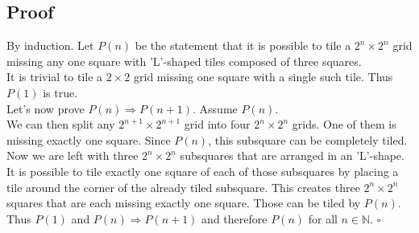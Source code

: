 \documentclass{article}
\begin{document}
\subsection*{Proof}
By induction. Let $P(n)$ be the statement that it is possible to tile a $2^n\times 2^n$ grid missing any one square with 'L'-shaped tiles composed of three squares.\\
It is trivial to tile a $2\times 2$ grid missing one square with a single such tile. Thus $P(1)$ is true.\\
Let's now prove $P(n)\Rightarrow P(n+1)$. 
Assume $P(n)$.\\
We can then split any $2^{n+1}\times 2^{n+1}$ grid into four $2^n\times 2^n$ grids. One of them is missing exactly one square. 
Since $P(n)$, this subsquare can be completely tiled. 
Now we are left with three $2^n\times 2^n$ subsquares that are arranged in an 'L'-shape.
It is possible to tile exactly one square of each of those subsquares by placing a tile around the corner of the already tiled subsquare.
This creates three $2^{n}\times 2^{n}$ squares that are each missing exactly one square. Those can be tiled by $P(n)$.\\
Thus $P(1)$ and $P(n)\Rightarrow P(n+1)$ and therefore $P(n)$ for all $n\in\mathbb{N}$. $\square$
\end{document}
